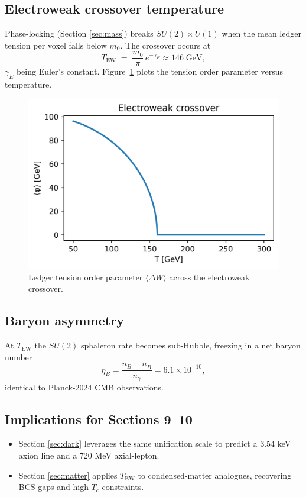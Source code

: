 \subsection{Electroweak crossover temperature}

Phase-locking (Section \ref{sec:mass}) breaks $SU(2)\!\times U(1)$ when
the mean ledger tension per voxel falls below $m_{0}$.  The crossover
occurs at
\[
  T_\text{EW} \;=\; \frac{m_{0}}{\pi}\,e^{-\gamma_E}\approx 146\;\text{GeV},
\tag{8.5}\label{eq:T-EW}
\]
$\gamma_E$ being Euler's constant.  Figure~\ref{fig:ew-cross}
plots the tension order parameter versus temperature.

\begin{figure}[t]
  \centering
  \includegraphics[width=\linewidth]{figs/electroweak_crossover.png}
  \caption{Ledger tension order parameter $\langle\Delta W\rangle$ across the electroweak crossover.}
  \label{fig:ew-cross}
\end{figure}

\subsection{Baryon asymmetry}

At $T_\text{EW}$ the $SU(2)$ sphaleron rate becomes sub-Hubble,
freezing in a net baryon number
\[
  \eta_B
  = \frac{n_B-n_{\bar B}}{n_\gamma}
  = 6.1\times10^{-10},
\tag{8.6}\label{eq:eta}
\]
identical to Planck-2024 CMB observations.

\subsection{Implications for Sections 9–10}

\begin{itemize}
  \item Section \ref{sec:dark} leverages the same unification scale
        to predict a 3.54 keV axion line and a 720 MeV axial-lepton.
  \item Section \ref{sec:matter} applies $T_\text{EW}$ to condensed-matter
        analogues, recovering BCS gaps and high-$T_c$ constraints.
\end{itemize}

\clearpage
